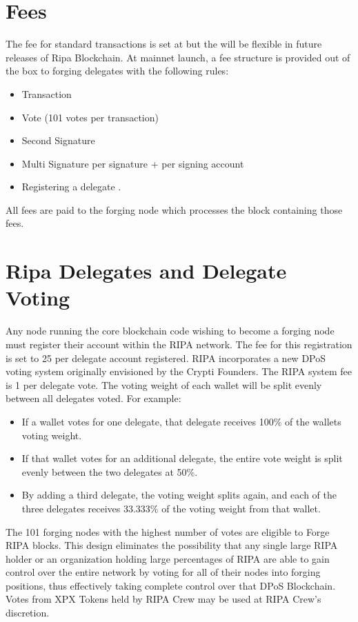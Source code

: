 \documentclass[11pt,fleqn]{book} %
\begin{document}
\section{Fees}
The fee for standard transactions is set at  but the will be flexible in future releases of Ripa Blockchain.
At mainnet launch, a fee structure is provided out of the box to forging delegates with the following rules:
	\begin{itemize}
		\item Transaction 
		\item Vote  (101 votes per transaction)
		\item Second Signature 
		\item Multi Signature  per signature +  per signing account
		\item Registering a delegate .
	\end{itemize}
All fees are paid to the forging node which processes the block containing those fees.

\section{Ripa Delegates and Delegate Voting}
Any node running the core blockchain code wishing to become a forging node must
register their account within the RIPA network. The fee for this registration is set to
25 \PHP per delegate account registered.
RIPA incorporates a new DPoS voting system originally envisioned by the Crypti
Founders. The RIPA system fee is 1 \PHP per delegate vote. The voting weight of each
wallet will be split evenly between all delegates voted. For example:
\begin{itemize}
	\item If a wallet votes for one delegate, that delegate receives 100\% of the wallets
voting weight.
	\item If that wallet votes for an additional delegate, the entire vote weight is split
evenly between the two delegates at 50\%.
	\item By adding a third delegate, the voting weight splits again, and each of the
three delegates receives 33.333\% of the voting weight from that wallet.
\end{itemize}

The 101 forging nodes with the highest number of votes are eligible to Forge RIPA
blocks. This design eliminates the possibility that any single large RIPA holder or an
organization holding large percentages of RIPA are able to gain control over the
entire network by voting for all of their nodes into forging positions, thus effectively
taking complete control over that DPoS Blockchain. Votes from XPX Tokens held by
RIPA Crew may be used at RIPA Crew's discretion.
\end{document}
